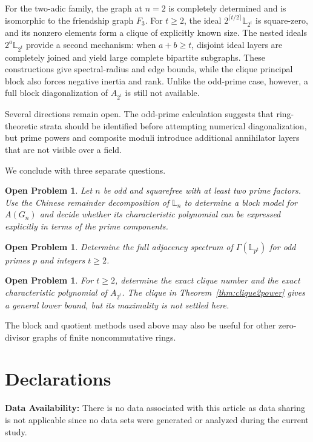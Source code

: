 \documentclass[12pt]{article}
\newtheorem{openproblem}[theorem]{Open Problem}
\theoremstyle{definition}
\newcommand{\LL}{\mathbb{L}}
\begin{document}
	For the two-adic family, the graph at $n=2$ is completely determined and is isomorphic to the friendship graph $F_3$. For $t\ge2$, the ideal $2^{\lceil t/2\rceil}\LL_{2^t}$ is square-zero, and its nonzero elements form a clique of explicitly known size. The nested ideals $2^a\LL_{2^t}$ provide a second mechanism: when $a+b\ge t$, disjoint ideal layers are completely joined and yield large complete bipartite subgraphs. These constructions give spectral-radius and edge bounds, while the clique principal block also forces negative inertia and rank. Unlike the odd-prime case, however, a full block diagonalization of $A_{2^t}$ is still not available.
	
	Several directions remain open. The odd-prime calculation suggests that ring-theoretic strata should be identified before attempting numerical diagonalization, but prime powers and composite moduli introduce additional annihilator layers that are not visible over a field.
	
	We conclude with three separate questions.
	\begin{openproblem}
		Let $n$ be odd and squarefree with at least two prime factors. Use the Chinese remainder decomposition of $\LL_n$ to determine a block model for $A(G_n)$ and decide whether its characteristic polynomial can be expressed explicitly in terms of the prime components.
	\end{openproblem}
	
	\begin{openproblem}
		Determine the full adjacency spectrum of $\Gamma(\LL_{p^t})$ for odd primes $p$ and integers $t\ge2$.
	\end{openproblem}
	
	\begin{openproblem}
		For $t\ge2$, determine the exact clique number and the exact characteristic polynomial of $A_{2^t}$. The clique in Theorem~\ref{thm:clique2power} gives a general lower bound, but its maximality is not settled here.
	\end{openproblem}
	
	The block and quotient methods used above may also be useful for other zero-divisor graphs of finite noncommutative rings.
	\section*{Declarations}
	\noindent \textbf{Data Availability:}	There is no data associated with this article as data sharing is not applicable since no data sets were generated or analyzed during the current study.
	
\end{document}
